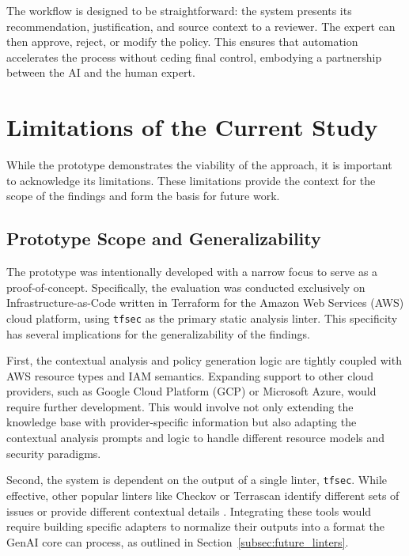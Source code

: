 The workflow is designed to be straightforward: the system presents its recommendation, justification, and source context to a reviewer. The expert can then approve, reject, or modify the policy. This ensures that automation accelerates the process without ceding final control, embodying a partnership between the AI and the human expert.

\section{Limitations of the Current Study}
\label{sec:limitations}

While the prototype demonstrates the viability of the approach, it is important to acknowledge its limitations. These limitations provide the context for the scope of the findings and form the basis for future work.

\subsection{Prototype Scope and Generalizability}
The prototype was intentionally developed with a narrow focus to serve as a proof-of-concept. Specifically, the evaluation was conducted exclusively on Infrastructure-as-Code written in Terraform for the Amazon Web Services (AWS) cloud platform, using \texttt{tfsec} as the primary static analysis linter. This specificity has several implications for the generalizability of the findings.

First, the contextual analysis and policy generation logic are tightly coupled with AWS resource types and IAM semantics. Expanding support to other cloud providers, such as Google Cloud Platform (GCP) or Microsoft Azure, would require further development. This would involve not only extending the knowledge base with provider-specific information but also adapting the contextual analysis prompts and logic to handle different resource models and security paradigms.

Second, the system is dependent on the output of a single linter, \texttt{tfsec}. While effective, other popular linters like Checkov or Terrascan identify different sets of issues or provide different contextual details \cite{spacelift_infrastructure_2025}. Integrating these tools would require building specific adapters to normalize their outputs into a format the GenAI core can process, as outlined in Section~\ref{subsec:future_linters}.

